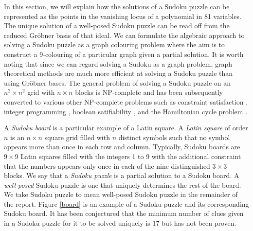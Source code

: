 \documentclass[../main.tex]{subfiles}
\begin{document}
    
    
    In this section, we will explain how the solutions of a Sudoku puzzle can be represented as the points in the vanishing locus of a polynomial in 81 variables. The unique solution of a well-posed Sudoku puzzle can be read off from the reduced Gr\"obner basis of that ideal. We can formulate the algebraic approach to solving a Sudoku puzzle as a graph colouring problem where the aim is to construct a 9-colouring of a particular graph given a partial solution. It is worth noting that since we can regard solving a Sudoku as a graph problem, graph theoretical methods are much more efficient at solving a Sudoku puzzle than using Gr\"obner bases. The general problem of solving a Sudoku puzzle on an $n^2\times n^2$ grid with $n\times n$ blocks is NP-complete and has been subsequently converted to various other NP-complete problems such as constraint satisfaction \citep{simonis2005sudoku}, integer programming \citep{bartlett2008integer}, boolean satifiability \citep{ist2006sudoku}, and the Hamiltonian cycle problem \citep{haythorpe2016reducing}.

    A \emph{Sudoku board} is a particular example of a Latin square. A \emph{Latin square} of order $n$ is an $n\times n$ square grid filled with $n$ distinct symbols such that no symbol appears more than once in each row and column. Typically, Sudoku boards are $9\times 9$ Latin squares filled with the integers 1 to 9 with the additional constraint that the numbers appears only once in each of the nine distinguished $3\times 3$ blocks. We say that a \emph{Sudoku puzzle} is a partial solution to a Sudoku board. A \emph{well-posed} Sudoku puzzle is one that uniquely determines the rest of the board. We take Sudoku puzzle to mean well-posed Sudoku puzzle in the remainder of the report. Figure \ref{board} is an example of a Sudoku puzzle and its corresponding Sudoku board. It has been conjectured that the minimum number of clues given in a Sudoku puzzle for it to be solved uniquely is 17 but has not been proven.
\end{document}
